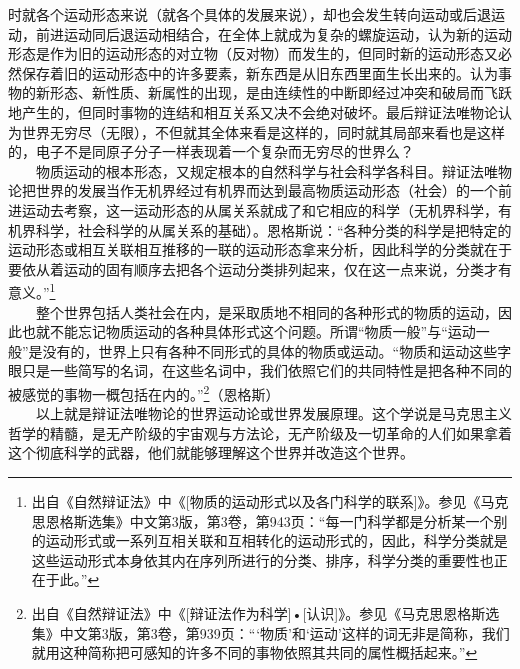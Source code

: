 \documentclass[cn,11pt,chinese]{elegantbook}
\begin{document}
时就各个运动形态来说（就各个具体的发展来说），却也会发生转向运动或后退运动，前进运动同后退运动相结合，在全体上就成为复杂的螺旋运动，认为新的运动形态是作为旧的运动形态的对立物（反对物）而发生的，但同时新的运动形态又必然保存着旧的运动形态中的许多要素，新东西是从旧东西里面生长出来的。认为事物的新形态、新性质、新属性的出现，是由连续性的中断即经过冲突和破局而飞跃地产生的，但同时事物的连结和相互关系又决不会绝对破坏。最后辩证法唯物论认为世界无穷尽（无限），不但就其全体来看是这样的，同时就其局部来看也是这样的，电子不是同原子分子一样表现着一个复杂而无穷尽的世界么？\\
　　物质运动的根本形态，又规定根本的自然科学与社会科学各科目。辩证法唯物论把世界的发展当作无机界经过有机界而达到最高物质运动形态（社会）的一个前进运动去考察，这一运动形态的从属关系就成了和它相应的科学（无机界科学，有机界科学，社会科学的从属关系的基础）。恩格斯说：“各种分类的科学是把特定的运动形态或相互关联相互推移的一联的运动形态拿来分析，因此科学的分类就在于要依从着运动的固有顺序去把各个运动分类排列起来，仅在这一点来说，分类才有意义。”\footnote[13]{ 出自《自然辩证法》中《[物质的运动形式以及各门科学的联系]》。参见《马克思恩格斯选集》中文第3版，第3卷，第943页：“每一门科学都是分析某一个别的运动形式或一系列互相关联和互相转化的运动形式的，因此，科学分类就是这些运动形式本身依其内在序列所进行的分类、排序，科学分类的重要性也正在于此。”}\\
　　整个世界包括人类社会在内，是采取质地不相同的各种形式的物质的运动，因此也就不能忘记物质运动的各种具体形式这个问题。所谓“物质一般”与“运动一般”是没有的，世界上只有各种不同形式的具体的物质或运动。“物质和运动这些字眼只是一些简写的名词，在这些名词中，我们依照它们的共同特性是把各种不同的被感觉的事物一概包括在内的。”\footnote[14]{ 出自《自然辩证法》中《[辩证法作为科学]•[认识]》。参见《马克思恩格斯选集》中文第3版，第3卷，第939页：“‘物质’和‘运动’这样的词无非是简称，我们就用这种简称把可感知的许多不同的事物依照其共同的属性概括起来。”}（恩格斯）\\
　　以上就是辩证法唯物论的世界运动论或世界发展原理。这个学说是马克思主义哲学的精髓，是无产阶级的宇宙观与方法论，无产阶级及一切革命的人们如果拿着这个彻底科学的武器，他们就能够理解这个世界并改造这个世界。\\
\end{document}

